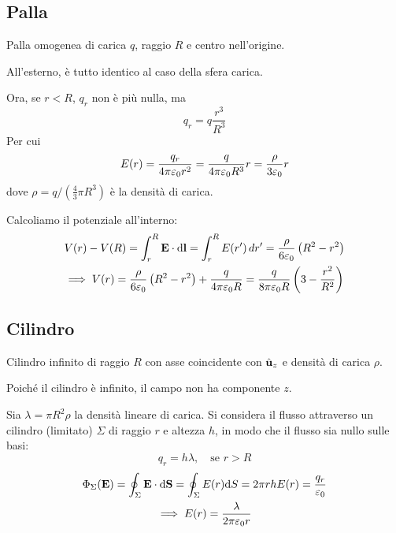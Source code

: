 \subsection{Palla}

Palla omogenea di carica $q$, raggio $R$ e centro nell'origine.

All'esterno, è tutto identico al caso della sfera carica.

Ora, se $r < R$, $q_r$ non è più nulla, ma
\begin{equation}
    q_r = q \frac{r^3}{R^3}
\end{equation}
Per cui
\begin{equation}
    E(r) = \frac{q_r}{4\pi\varepsilon_0 r^2}
    = \frac{q}{4\pi\varepsilon_0 R^3} r
    = \frac{\rho}{3\varepsilon_0} r
\end{equation}
dove $\rho = q / (\frac{4}{3} \pi R^3)$ è la densità di carica.

Calcoliamo il potenziale all'interno:
\begin{equation}
\begin{gathered}
    V(r) - V(R) = \int_r^R \mathbf{E} \cdot \mathrm{d} \mathbf{l} = \int_r^R E(r') \, dr' = \frac{\rho}{6\varepsilon_0} \left( R^2 - r^2 \right) \\
    \implies V(r) = \frac{\rho}{6\varepsilon_0} \left( R^2 - r^2 \right) + \frac{q}{4\pi\varepsilon_0 R} = \frac{q}{8\pi\varepsilon_0 R} \left( 3 - \frac{r^2}{R^2} \right)
\end{gathered}
\end{equation}


\subsection{Cilindro}

Cilindro infinito di raggio $R$ con asse coincidente con $\hat{\mathbf{u}}_{z}$ e densità di carica $\rho$.

Poiché il cilindro è infinito, il campo non ha componente $z$.

Sia $\lambda = \pi R^2 \rho$ la densità lineare di carica.
Si considera il flusso attraverso un cilindro (limitato) $\Sigma$ di raggio $r$ e altezza $h$, in modo che il flusso sia nullo sulle basi:
\begin{equation}
    q_r = h \lambda, \quad \text{se } r > R
\end{equation}
\begin{equation}
\begin{gathered}
    \Phi_\Sigma(\mathbf{E}) = \oint_\Sigma \mathbf{E} \cdot \mathrm{d} \mathbf{S} = \oint_\Sigma E(r) \mathrm{d} S = 2\pi r h E(r) = \frac{q_r}{\varepsilon_0} \\
    \implies E(r) = \frac{\lambda}{2\pi\varepsilon_0 r}
\end{gathered}
\end{equation}

